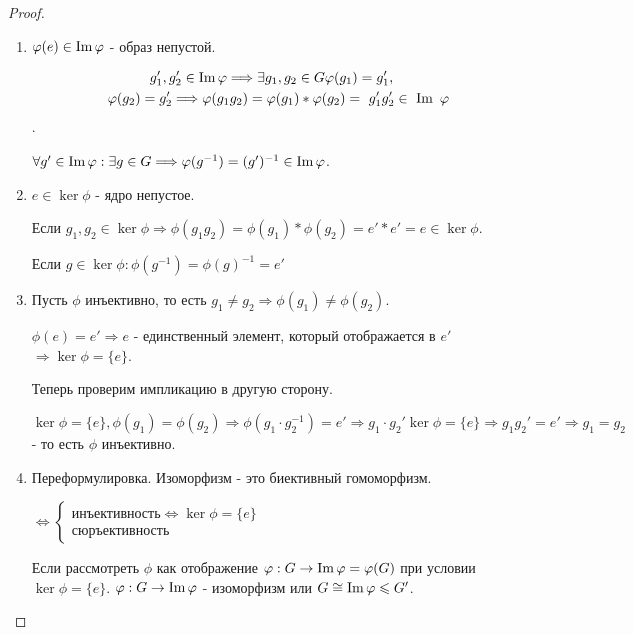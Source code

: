 \begin{proof}
	\begin{enumerate}
		\item \(\varphi(e)\in \operatorname{Im} \varphi \) - образ непустой. 
		
		\begin{multline*} g_1', g_2'\in \operatorname{Im} \varphi \Longrightarrow \exists g_1, g_2\in G \varphi(g_1)=g_1', \\ \quad \varphi(g_2) = g_2'\Longrightarrow \varphi(g_1g_2) = \varphi(g_1)*\varphi(g_2)=~g_1'g_2'\in~\operatorname{Im}~\varphi\end{multline*}.
		
		\(\forall g'\in\operatorname{Im}\varphi:\exists g\in G \Longrightarrow\varphi(g^{-1}) = (g')^{-1}\in\operatorname{Im} \varphi \).
		
		\item \(e\in \ker \phi\) - ядро непустое. 
		
		Если \(g_1, g_2\in \ker \phi\Longrightarrow \phi(g_1g_2) = \phi(g_1)*\phi(g_2) = e'*e' = e\in \ker \phi\). 
		
		Если \(g\in \ker \phi: \phi(g^{-1}) = \phi(g)^{-1} = e'\)
		
		\item Пусть $\phi$ инъективно, то есть \(g_1\ne g_2\Longrightarrow \phi(g_1)\ne \phi(g_2) \).
		
		\(\phi(e) = e' \Rightarrow e\) - единственный элемент, который отображается в $e'$ \(\Longrightarrow \ker\phi = \{e\}\).\newline
		
		Теперь проверим импликацию в другую сторону. 
		
		\(\ker\phi = \{e\}, \phi(g_1) = \phi(g_2) \Longrightarrow \phi(g_1\cdot g_2^{-1}) = e' \Longrightarrow g_1\cdot g_2'\ker\phi=\{e\} \Longrightarrow g_1g_2'= e' \Longrightarrow g_1 = g_2\) - то есть $\phi$ инъективно.
		
		\item Переформулировка. Изоморфизм - это биективный гомоморфизм. \newline
		 
		\(\Longleftrightarrow \left\{\begin{gathered}
		\text{инъективность} \Longleftrightarrow \ker\phi = \{e\} \\
		\text{сюръективность} 
		\end{gathered}\right.\) 
		
		Если рассмотреть $\phi$ как отображение \(\varphi:G\to \operatorname{Im} \varphi = \varphi(G)\) при условии \(\ker \phi = \{e\}\). \(\varphi:G\to \operatorname{Im}\varphi\) - изоморфизм или \(G\cong \operatorname{Im}\varphi\leqslant G'\).
	\end{enumerate}
\end{proof}
